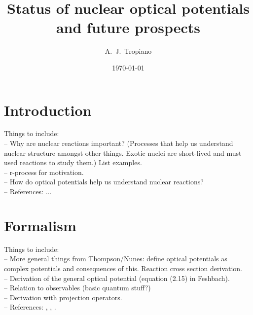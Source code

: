 \documentclass[preprintnumbers,floatfix,aps,prc,preprint,nofootinbib]{revtex4-1}
\begin{document}
\title{Status of nuclear optical potentials and future prospects}


\author{A.~J.~Tropiano}


\date{\today}

\maketitle

\newpage


\section{Introduction}
\label{sec:intro}


Things to include:
\\
-- Why are nuclear reactions important? (Processes that help us understand nuclear structure amongst other things. Exotic nuclei are short-lived and must used reactions to study them.) List examples.
\\
-- r-process for motivation.
\\
-- How do optical potentials help us understand nuclear reactions?
\\
-- References: ...


\section{Formalism}
\label{sec:formalism}


Things to include:
\\
-- More general things from Thompson/Nunes: define optical potentials as complex potentials and consequences of this. Reaction cross section derivation.
\\
-- Derivation of the general optical potential (equation (2.15) in Feshbach).
\\
-- Relation to observables (basic quantum stuff?)
\\
-- Derivation with projection operators.
\\
-- References: \cite{Feshbach:1958nx}, \cite{Feshbach:1962ut}, \cite{thompson_nunes_2009}.


\end{document}
